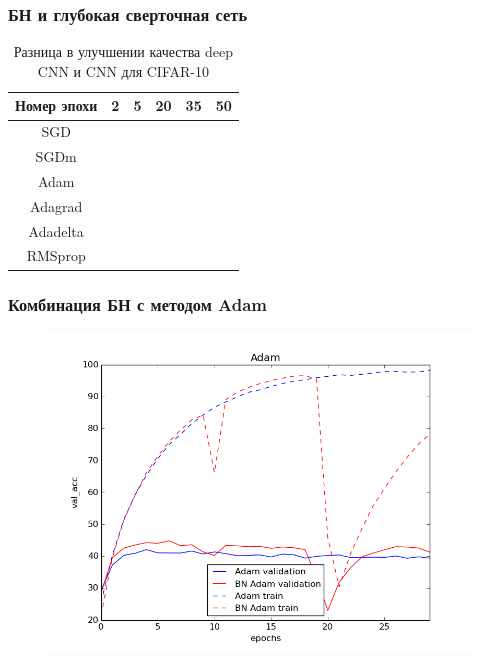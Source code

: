 \documentclass{beamer}
\begin{document}
\begin{frame}
	\frametitle{\small БН и глубокая сверточная сеть}
\begin{table}[h!]

\centering
\scriptsize
\begin{tabular}{|c|c|c|c|c|c|}\hline
\textbf{Номер эпохи} & \textbf{2} & \textbf{5} & \textbf{20} & \textbf{35} & \textbf{50} \\\hline
SGD & \color{green}{0.1} & \color{green}{0.23} & \color{green}{0.41} & \color{green}{0.44} & \color{green}{0.34} \\\hline

SGDm & \color{green}{0.1} & \color{green}{0.31} & \color{green}{0.36} & \color{green}{0.42} & \color{green}{0.18} \\\hline

Adam & \color{green}{0.17} & \color{green}{0.35} & \color{green}{0.37} & \color{green}{0.41} & \color{green}{0.37} \\\hline

Adagrad & \color{red}{-0.05} & \color{green}{0.21} & \color{green}{0.24} & \color{green}{0.28} & \color{green}{0.28} \\\hline

Adadelta & \color{green}{0.14} & \color{green}{0.25} & \color{green}{0.51} & \color{green}{0.45} & \color{green}{0.43} \\\hline

RMSprop & \color{red}{-0.1} & \color{green}{0.27} & \color{green}{0.37} & \color{green}{0.46} & \color{green}{0.42} \\\hline

\end{tabular}
\caption{\scriptsize Разница в улучшении качества deep CNN и CNN для CIFAR-10}
\end{table}
\end{frame}

\begin{frame}
	\frametitle{\small Комбинация БН с методом Adam}
\begin{figure}
\centering
\includegraphics[scale=0.4]{adam_shallow.png}
\end{figure}
\end{frame}
\end{document}
